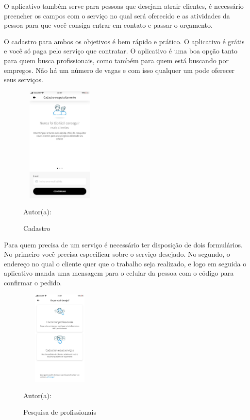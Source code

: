 O aplicativo também serve para pessoas que desejam atrair clientes, é necessário preencher os campos com o serviço no qual será oferecido e as atividades da pessoa para que você consiga entrar em contato e passar o orçamento.

O cadastro para ambos os objetivos é bem rápido e prático. O aplicativo é grátis e você só paga pelo serviço que contratar. O aplicativo é uma boa opção tanto para quem busca profissionais, como também para quem está buscando por empregos. Não há um número de vagas e com isso qualquer um pode oferecer seus serviços.

\begin{figure}[!h]
	\centering
	\caption{Cadastro }
	\includegraphics[width=150px, height=220px]{./images/getNinjasMobile.jpeg}
	\par {Autor(a): \cite{get-ninjasMobilea}}
\end{figure}

Para quem precisa de um serviço é necessário ter disposição de dois formulários. No primeiro você precisa especificar sobre o serviço desejado. No segundo, o endereço no qual o cliente quer que o trabalho seja realizado, e logo em seguida o aplicativo manda uma mensagem para o celular da pessoa com o código para confirmar o pedido.

\begin{figure}[!h]
	\centering
	\caption{Pesquisa de profissionais}
	\includegraphics[width=150px, height=180px]{./images/getNinjasMobile3.jpeg}
	\par {Autor(a): \cite{get-ninjasMobilea}}
\end{figure}
\newpage


